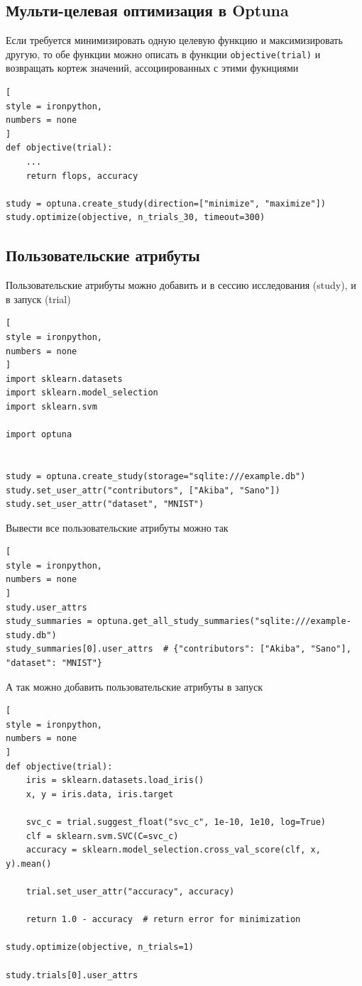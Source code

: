 \documentclass[%
	11pt,
	a4paper,
	utf8,
		]{article}
\begin{document}
\subsection{Мульти-целевая оптимизация в Optuna}

Если требуется минимизировать одную целевую функцию и максимизировать другую, то обе функции можно описать в функции \verb|objective(trial)| и возвращать кортеж значений, ассоциированных с этими фукнциями
\begin{lstlisting}[
style = ironpython,
numbers = none
]
def objective(trial):
    ...
    return flops, accuracy
    
study = optuna.create_study(direction=["minimize", "maximize"])
study.optimize(objective, n_trials_30, timeout=300)
\end{lstlisting}

\subsection{Пользовательские атрибуты}

Пользовательские атрибуты можно добавить и в сессию исследования (study), и в запуск (trial)
\begin{lstlisting}[
style = ironpython,
numbers = none
]
import sklearn.datasets
import sklearn.model_selection
import sklearn.svm

import optuna


study = optuna.create_study(storage="sqlite:///example.db")
study.set_user_attr("contributors", ["Akiba", "Sano"])
study.set_user_attr("dataset", "MNIST")
\end{lstlisting}

Вывести все пользовательские атрибуты можно так
\begin{lstlisting}[
style = ironpython,
numbers = none
]
study.user_attrs
study_summaries = optuna.get_all_study_summaries("sqlite:///example-study.db")
study_summaries[0].user_attrs  # {"contributors": ["Akiba", "Sano"], "dataset": "MNIST"}
\end{lstlisting}

А так можно добавить пользовательские атрибуты в запуск
\begin{lstlisting}[
style = ironpython,
numbers = none
]
def objective(trial):
	iris = sklearn.datasets.load_iris()
	x, y = iris.data, iris.target
	
	svc_c = trial.suggest_float("svc_c", 1e-10, 1e10, log=True)
	clf = sklearn.svm.SVC(C=svc_c)
	accuracy = sklearn.model_selection.cross_val_score(clf, x, y).mean()
	
	trial.set_user_attr("accuracy", accuracy)
	
	return 1.0 - accuracy  # return error for minimization

study.optimize(objective, n_trials=1)

study.trials[0].user_attrs
\end{lstlisting}
\end{document}

